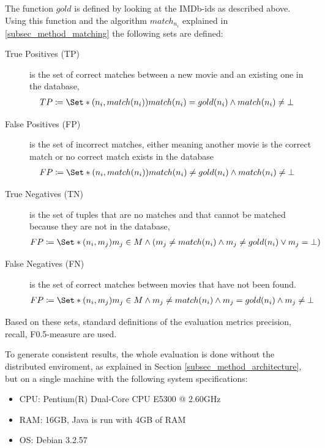 The function $gold$ is defined by looking at the IMDb-ids as described above.
Using this function and the algorithm $match_{n_{i}}$ explained in \ref{subsec_method_matching} the following sets are defined:

\begin{description}
\item[True Positives (TP)] is the set of correct matches between a new movie and an existing one in the database,
\begin{align}
TP &\coloneqq \Set*{(n_i, match(n_i))}{match(n_i) = gold(n_i) \land match(n_i) \neq \bot}
\end{align}
\item[False Positives (FP)] is the set of incorrect matches, either meaning another movie is the correct match or no correct match exists in the database
\begin{align}
FP &\coloneqq \Set*{(n_i, match(n_i))}{match(n_i) \neq gold(n_i) \land match(n_i) \neq \bot}
\end{align}\item[True Negatives (TN)] is the set of tuples that are no matches and that cannot be matched because they are not in the database,
\begin{align}
FP &\coloneqq \Set*{(n_i, m_j)}{m_j \in M \land (m_j \neq match(n_i) \land m_j \neq gold(n_i) \lor m_j = \bot)}
\end{align}
\item[False Negatives (FN)] is the set of correct matches between movies that have not been found.
\begin{align}
FP &\coloneqq \Set*{(n_i, m_j)}{m_j \in M \land m_j \neq match(n_i) \land m_j = gold(n_i) \land m_j \neq \bot}
\end{align}
\end{description}

Based on these sets, standard definitions of the evaluation metrics precision, recall, F0.5-measure are used.

To generate consistent results, the whole evaluation is done without the distributed enviroment, as explained in Section \ref{subsec_method_architecture}, but on a single machine with the following system specifications:
\begin{itemize}
	\item CPU: Pentium(R) Dual-Core  CPU E5300  @ 2.60GHz
	\item RAM: 16GB, Java is run with 4GB of RAM
	\item OS: Debian 3.2.57
\end{itemize}

